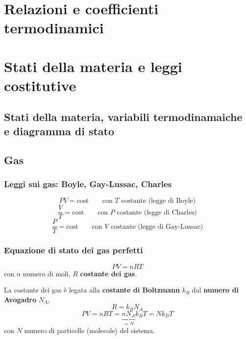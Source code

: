\chapter{Relazioni e coefficienti termodinamici}

\chapter{Stati della materia e leggi costitutive}
\section{Stati della materia, variabili termodinamaiche e diagramma di stato}
\section{Gas}
\subsection{Leggi sui gas: Boyle, Gay-Lussac, Charles}
\begin{equation}
    P V = \text{cost} \qquad \text{con $T$ costante (legge di Boyle)}
\end{equation}
\begin{equation}
    \dfrac{V}{T} = \text{cost} \qquad \text{con $P$ costante (legge di Charles)}
\end{equation}
\begin{equation}
    \dfrac{P}{T} = \text{cost} \qquad \text{con $V$ costante (legge di Gay-Lussac)}
\end{equation}
\subsection{Equazione di stato dei gas perfetti}
\begin{equation}
    P V = n R T
\end{equation}
con $n$ numero di moli, $R$ \textbf{costante dei gas}.

La costante dei gas è legata alla \textbf{costante di Boltzmann} $k_B$ dal \textbf{numero di Avogadro} $N_A$,
\begin{equation}
    R = k_B N_A
\end{equation}
\begin{equation}
    P V = n R T = \underbrace{n N_A}_{= N} k_B T = N k_B T
\end{equation}
con $N$ numero di particelle (molecole) del sistema.

